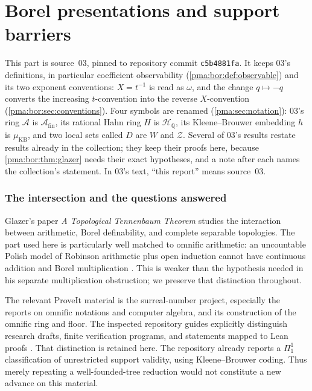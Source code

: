 \documentclass[11pt]{article}
\numberwithin{equation}{section}
\theoremstyle{definition}
\theoremstyle{remark}
\newcommand{\Q}{\mathbb Q}
\newcommand{\A}{\mathcal A_{\mathrm{fin}}}
\newcommand{\HQ}{\mathcal H_{\Q}}
\newcommand{\muKB}{\mu_{\mathrm{KB}}}
\begin{document}
\part{Borel presentations and support barriers}\label{pma:part:bor}

This part is source~03, pinned to repository commit \texttt{c5b4881fa}. It
keeps 03's definitions, in particular coefficient observability
(\cref{pma:bor:def:observable}) and its two exponent conventions: $X=t^{-1}$
is read as $\omega$, and the change $q\mapsto-q$ converts the increasing
$t$-convention into the reverse $X$-convention (\cref{pma:bor:sec:conventions}).
Four symbols are renamed (\cref{pma:sec:notation}): 03's ring $\mathcal A$ is
$\A$, its rational Hahn ring $H$ is $\HQ$, its Kleene--Brouwer embedding $h$ is
$\muKB$, and two local sets called $D$ are $W$ and $\mathcal Z$. Several of
03's results restate results already in the collection; they keep their
proofs here, because \cref{pma:bor:thm:glazer} needs their exact hypotheses,
and a note after each names the collection's statement. In 03's text,
``this report'' means source~03.

\section{The intersection and the questions answered}
\label{pma:bor:sec:intro}

Glazer's paper \emph{A Topological Tennenbaum Theorem} studies the interaction
between arithmetic, Borel definability, and complete separable topologies.
The part used here is particularly well matched to omnific arithmetic:
an uncountable Polish model of Robinson arithmetic plus open induction cannot
have continuous addition and Borel multiplication
\cite[Corollary 1]{Glazer}. This is weaker than the hypothesis needed in his
separate multiplication obstruction; we preserve that distinction throughout.

The relevant ProveIt material is the surreal-number project, especially the
reports on omnific notations and computer algebra, and its construction of the
omnific ring and floor. The inspected repository guides explicitly distinguish
research drafts, finite verification programs, and statements mapped to Lean
proofs \cite{RepoMain,RepoNotations}. That distinction is retained here. The
repository already reports a $\Pi^1_1$ classification of unrestricted support
validity, using Kleene--Brouwer coding. Thus merely repeating a
well-founded-tree reduction would not constitute a new advance on this material.
\end{document}
